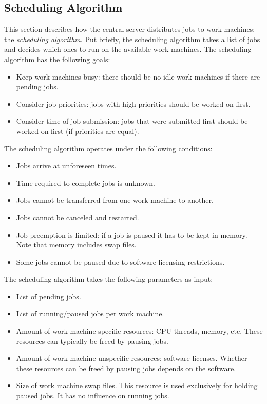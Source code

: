 \subsection{Scheduling Algorithm}
This section describes how the central server distributes jobs to work machines: the \textit{scheduling algorithm}.
Put briefly, the scheduling algorithm takes a list of jobs and decides which ones to run on the available work machines.
The scheduling algorithm has the following goals:
\begin{itemize}
\item Keep work machines busy: there should be no idle work machines if there are pending jobs.
\item Consider job priorities: jobs with high priorities should be worked on first.
\item Consider time of job submission: jobs that were submitted first should be worked on first (if priorities are equal).
\end{itemize}
The scheduling algorithm operates under the following conditions:
\begin{itemize}
\item Jobs arrive at unforeseen times.
\item Time required to complete jobs is unknown.
\item Jobs cannot be transferred from one work machine to another.
\item Jobs cannot be canceled and restarted.
\item Job preemption is limited: if a job is paused it has to be kept in memory.
Note that memory includes swap files.
\item Some jobs cannot be paused due to software licensing restrictions.
\end{itemize}
The scheduling algorithm takes the following parameters as input:
\begin{itemize}
\item List of pending jobs.
\item List of running/paused jobs per work machine.
\item Amount of work machine specific resources: CPU threads, memory, etc.
These resources can typically be freed by pausing jobs.
\item Amount of work machine unspecific resources: software licenses.
Whether these resources can be freed by pausing jobs depends on the software.
\item Size of work machine swap files.
This resource is used exclusively for holding paused jobs.
It has no influence on running jobs.
\end{itemize}
